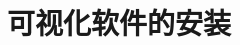 \documentclass{article}      %
\begin{document}
\graphicspath{{figure/}}
%
\renewcommand{\abstractname}{\small{\CJKfamily{hei} 摘\quad 要}} %
\renewcommand{\refname}{\centering\CJKfamily{hei} 参考文献}
\renewcommand{\figurename}{{\bf Fig}.}
\renewcommand{\tablename}{{\bf Tab}.}

\makeatletter
\long{}
\makeatother

\newcommand{\keywords}[1]{{\hspace{0\ccwd}\small{\CJKfamily{hei} 关键词:}{\hspace{2ex}{#1}}\bigskip}}



\title{可视化软件的安装}

\author{
\small
\small
}
\date{}					%
\maketitle
\end{document}
